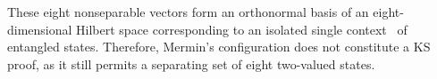 \documentclass[
  twocolumn,
 showpacs,
 showkeys,
 preprintnumbers,
 amsmath,amssymb,
 aps,
 prl,
  longbibliography,
 floatfix,
 ]{revtex4-2}
\begin{document}
%
These eight nonseparable vectors form an orthonormal basis of an eight-dimensional Hilbert space corresponding to an isolated single context~\cite[Table~1]{svozil-2020-ghz} of  entangled states.
Therefore, Mermin's configuration does not constitute a KS proof, as it still permits a separating set of eight two-valued states.
\end{document}
